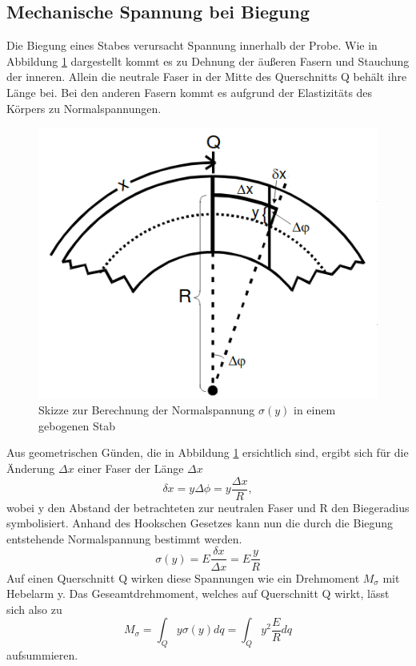 \subsection{Mechanische Spannung bei Biegung}
    \label{sec:aiaiai}
    Die Biegung eines Stabes verursacht Spannung innerhalb der Probe. Wie in Abbildung \ref{fig:backfisch}
    dargestellt kommt es zu Dehnung der äußeren Fasern und Stauchung der inneren. 
    Allein die neutrale Faser in der Mitte des Querschnitts Q behält ihre Länge bei.
    Bei den anderen Fasern kommt es aufgrund der Elastizitäts des Körpers zu Normalspannungen.
    \begin{figure}
        \centering
        \includegraphics[scale=0.5]{Backfisch.png}
        \caption{Skizze zur Berechnung der Normalspannung $\sigma(y)$ in einem gebogenen Stab}
        \label{fig:backfisch}
    \end{figure}
    Aus geometrischen Günden, die in Abbildung \ref{fig:backfisch} ersichtlich sind, 
    ergibt sich für die Änderung $\Delta x$ einer Faser der Länge $\Delta x$
    \begin{equation*}
        \delta x = y \Delta \phi= y\dfrac{\Delta x}{R},
    \end{equation*}
    wobei y den Abstand der betrachteten zur neutralen Faser und R den Biegeradius
    symbolisiert. Anhand des Hookschen Gesetzes kann nun die durch die Biegung 
    entstehende Normalspannung bestimmt werden.
    \begin{equation*}
        \sigma(y)=E\dfrac{\delta x}{\Delta x}=E \dfrac{y}{R}
    \end{equation*}
    Auf einen Querschnitt Q wirken diese Spannungen wie ein Drehmoment $M_{\sigma}$ mit
    Hebelarm y. Das Geseamtdrehmoment, welches auf Querschnitt Q wirkt, lässt sich also 
    zu
    \begin{equation}
        \label{eqn:fuckyou}
        M_{\sigma}=\int_Q y \sigma(y)dq = \int_Q y^2 \dfrac{E}{R}dq 
    \end{equation}
    aufsummieren. 
    
